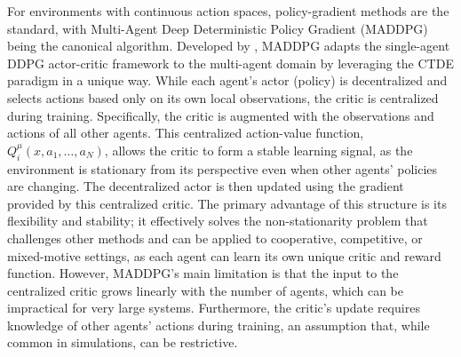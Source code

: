 For environments with continuous action spaces, policy-gradient methods are the standard, with Multi-Agent Deep Deterministic Policy Gradient (MADDPG) being the canonical algorithm. Developed by  \parencite{MADDPG}, MADDPG adapts the single-agent DDPG actor-critic framework to the multi-agent domain by leveraging the CTDE paradigm in a unique way. While each agent's actor (policy) is decentralized and selects actions based only on its own local observations, the critic is centralized during training. Specifically, the critic is augmented with the observations and actions of all other agents. This centralized action-value function, $Q_i^{\mu}(x, a_1, \dots, a_N)$, allows the critic to form a stable learning signal, as the environment is stationary from its perspective even when other agents' policies are changing. The decentralized actor is then updated using the gradient provided by this centralized critic. The primary advantage of this structure is its flexibility and stability; it effectively solves the non-stationarity problem that challenges other methods and can be applied to cooperative, competitive, or mixed-motive settings, as each agent can learn its own unique critic and reward function. However, MADDPG's main limitation is that the input to the centralized critic grows linearly with the number of agents, which can be impractical for very large systems. Furthermore, the critic's update requires knowledge of other agents' actions during training, an assumption that, while common in simulations, can be restrictive.

